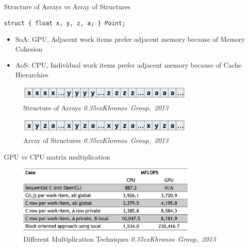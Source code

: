 \documentclass[10pt,aspectratio=169]{beamer} %
\begin{document}
\begin{frame}[fragile]{Structure of Arrays vs Array of Structures}
\begin{lstlisting}
struct { float x, y, z, a; } Point; 
\end{lstlisting}
\begin{itemize}
\item SoA: GPU, Adjacent work items prefer adjacent memory because of Memory Cohesion
\item AoS: CPU, Individual work items prefer adjacent memory because of Cache Hierarchies 
\end{itemize}
\begin{figure}
    \includegraphics[width=0.8\textwidth]{soa.png}
    \caption{Structure of Arrays \emph{\textcopyright \scriptsize\raise0.35ex\hbox{Khronos Group, 2013}}}
\end{figure}
\begin{figure}
    \includegraphics[width=0.8\textwidth]{Aos.png}
    \caption{Array of Structures \emph{\textcopyright \scriptsize\raise0.35ex\hbox{Khronos Group, 2013}}}
\end{figure}
\end{frame}

\begin{frame}{GPU vs CPU matrix multiplication}
\begin{figure}
    \includegraphics[width=0.8\textwidth]{MFlops.png}
    \caption{Different Multiplication Techniques \emph{\textcopyright \scriptsize\raise0.35ex\hbox{Khronos Group, 2013}}}
\end{figure}
\end{frame}
\end{document}
